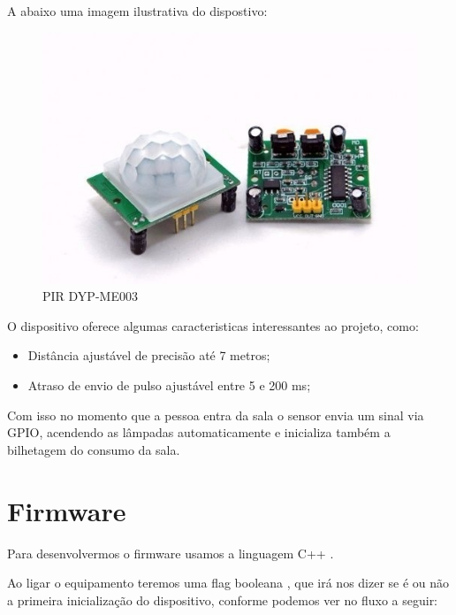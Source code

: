 \documentclass[openright]{normas-utf-tex} %
\begin{document}
A abaixo uma imagem ilustrativa do dispostivo:
\begin{figure}[!htb]
     \centering
     \includegraphics[scale=0.6]{PIR.jpg}
     \caption{PIR DYP-ME003}
     \label{fig:PIR DYP-ME003}
\end{figure}

O dispositivo oferece algumas caracteristicas interessantes ao projeto, como:

\begin{itemize}
    \item Distância ajustável de precisão até 7 metros;
    \item Atraso de envio de pulso ajustável entre 5 e 200 ms;
\end{itemize}

Com isso no momento que a pessoa entra da sala o sensor envia um sinal  via GPIO,  acendendo as lâmpadas automaticamente e inicializa também a bilhetagem do consumo da sala.

\section{Firmware}

Para desenvolvermos o firmware usamos a linguagem C++ \cite{Altabooks}. 

Ao ligar o equipamento teremos uma flag booleana \cite{Elsevier}, que irá nos dizer se é ou não a primeira inicialização do dispositivo, conforme podemos ver no fluxo a seguir:
\end{document}
